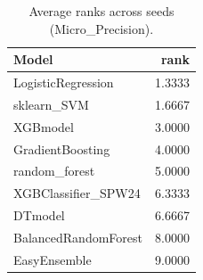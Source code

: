 \begin{table}[t]
\centering
\begin{tabular}{lr}
\toprule
Model & rank \\
\midrule
LogisticRegression & 1.3333 \\
sklearn_SVM & 1.6667 \\
XGBmodel & 3.0000 \\
GradientBoosting & 4.0000 \\
random_forest & 5.0000 \\
XGBClassifier_SPW24 & 6.3333 \\
DTmodel & 6.6667 \\
BalancedRandomForest & 8.0000 \\
EasyEnsemble & 9.0000 \\
\bottomrule
\end{tabular}
\caption{Average ranks across seeds (Micro_Precision).}
\label{tab:avg_rank_Micro_Precision}
\end{table}